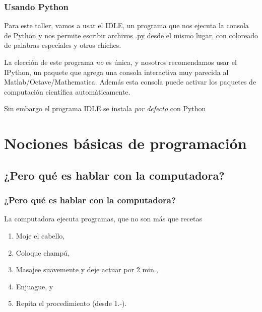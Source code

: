 \documentclass{beamer}
\begin{document}
\begin{frame}
    \frametitle{Usando Python}
    Para este taller, vamos a usar el IDLE, un programa que nos ejecuta la consola de Python y nos permite escribir archivos .py desde el mismo lugar, con coloreado de palabras especiales y otros chiches. 
    
    La elección de este programa \emph{no} es única, y nosotros recomendamos usar el IPython, un paquete que agrega una consola interactiva muy parecida al Matlab/Octave/Mathematica. Además esta consola puede activar los paquetes de computación científica automáticamente. 
    
    Sin embargo el programa IDLE se instala \emph{por defecto} con Python

\end{frame}



\section{Nociones básicas de programación}

\subsection{¿Pero qué es hablar con la computadora?}
\begin{frame}
    \frametitle{¿Pero qué es hablar con la computadora?}
    La computadora ejecuta programas, que no son más que recetas
    \begin{enumerate}
        \item Moje el cabello,
        \item Coloque champú,
        \item Masajee suavemente y deje actuar por 2 min.,
        \item Enjuague, y
        \item Repita el procedimiento (desde 1.-).
    \end{enumerate}
    
\end{frame}
\end{document}
